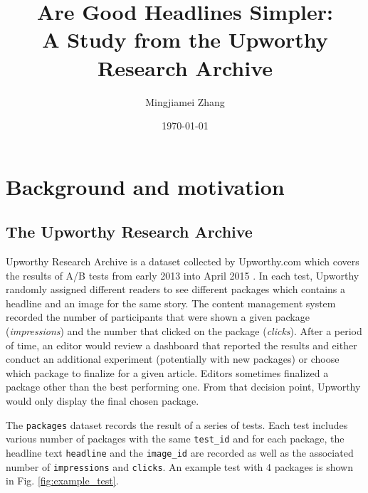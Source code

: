 \documentclass[%
preprint,
 amsmath,amssymb,
 aps,
]{revtex4-2}
\begin{document}

\title{Are Good Headlines Simpler:\\A Study from the Upworthy Research Archive}

\author{Mingjiamei Zhang}

\date{\today}%

\maketitle

\section{Background and motivation}
\subsection{The Upworthy Research Archive}

Upworthy Research Archive is a dataset collected by Upworthy.com which covers the results of A/B tests from early 2013 into April 2015 \cite{matias2021upworthy}.
In each test, Upworthy randomly assigned different readers to see different packages which contains a headline and an image for the same story.
The content management system recorded the number of participants that were shown a given package (\textit{impressions}) and the number that clicked on the package (\textit{clicks}). 
After a period of time, an editor would review a dashboard that reported the results and either conduct an additional experiment (potentially with new packages) or choose which package to finalize for a given article. 
Editors sometimes finalized a package other than the best performing one. From that decision point, Upworthy would only display the final chosen package.

The \texttt{packages} dataset records the result of a series of tests.
Each test includes various number of packages with the same \texttt{test\_id} and for each package, the headline text \texttt{headline} and the \texttt{image\_id} are recorded as well as the associated number of \texttt{impressions} and \texttt{clicks}.
An example test with 4 packages is shown in Fig. \ref{fig:example_test}.
\end{document}
